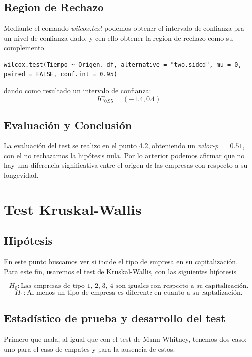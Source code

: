 \documentclass{article}
\begin{document}
    \subsection{Region de Rechazo}
    Mediante el comando \textit{wilcox.text} podemos obtener el intervalo de confianza pra un nivel de confianza dado, y con ello obtener la region de rechazo como su complemento.
    \begin{verbatim}
wilcox.test(Tiempo ~ Origen, df, alternative = "two.sided", mu = 0,
paired = FALSE, conf.int = 0.95)\end{verbatim}

    dando como resultado un intervalo de confianza:
    \begin{equation}
        IC_{0.95} = (-1.4, 0.4)
    \end{equation}
    \subsection{Evaluaci\'on y Conclusi\'on}
    La evaluaci\'on del test se realizo en el punto 4.2, obteniendo un \textit{valor-p} $= 0.51$, con el no rechazamos la hip\'otesis nula. Por lo anterior podemos afirmar que no hay una diferencia significativa entre el origen de las empresas con respecto a su longevidad.
    \section{Test Kruskal-Wallis}
    
    \subsection{Hip\'otesis}
    En este punto buscamos ver si incide el tipo de empresa en su capitalizaci\'on. Para este fin, usaremos el test de Kruskal-Wallis, con las siguientes hi\'potesis

    \begin{equation}
        H_0: \text{Las empresas de tipo 1, 2, 3, 4 son iguales con respecto a su capitalizaci\'on.}
    \end{equation}
    \begin{equation}
        H_1: \text{Al menos un tipo de empresa es diferente en cuanto a su captalizaci\'on.}
    \end{equation}

    \subsection{Estad\'istico de prueba y desarrollo del test}
    Primero que nada, al igual que con el test de Mann-Whitney, tenemos dos caso; uno para el caso de empates y para la ausencia de estos.
\end{document}
